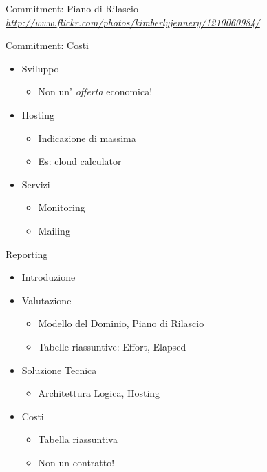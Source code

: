 \documentclass[compress, red, 14pt, pdf]{beamer}
\newcommand{\highlight}[1]{{\color{purple} \emph{#1}}}
\begin{document}
\begin{frame}{Commitment: Piano di Rilascio}
		\vspace*{0.5cm}
		{\footnotesize \highlight{\href{http://www.flickr.com/photos/kimberlyjennery/1210060984/}{http://www.flickr.com/photos/kimberlyjennery/1210060984/}}}

	\end{frame}
	
	\begin{frame}{Commitment: Costi}
		\begin{itemize}
			\item Sviluppo
				\begin{itemize}
					\item Non un'\highlight{offerta} economica!
				\end{itemize}
			\item Hosting
				\begin{itemize}
					\item Indicazione di massima
					\item Es: cloud calculator
				\end{itemize}
			\item Servizi
			\begin{itemize}
				\item Monitoring
				\item Mailing
			\end{itemize}
		\end{itemize}

	\end{frame}
	
	\begin{frame}{Reporting}
		\begin{itemize}
			\item Introduzione
			\item Valutazione
			\begin{itemize}
				\item Modello del Dominio, Piano di Rilascio
				\item Tabelle riassuntive: Effort, Elapsed
			\end{itemize}
			\item Soluzione Tecnica
			\begin{itemize}
				\item Architettura Logica, Hosting
			\end{itemize}
			\item Costi
			\begin{itemize}
				\item Tabella riassuntiva
				\item Non un contratto!
			\end{itemize}
		\end{itemize}
	\end{frame}
	
\end{document}
